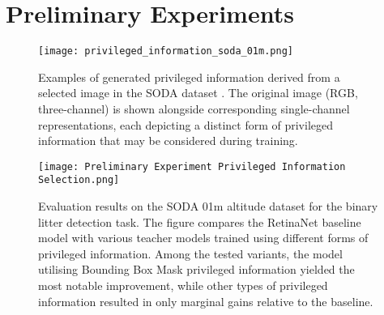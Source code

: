 \graphicspath{{content/appendices/figures/}}

\chapter{Preliminary Experiments}

\vfill
\begin{figure}[!htbp]
    \centering%
    \texttt{[image: privileged\_information\_soda\_01m.png]}
    \caption{Examples of generated privileged information derived from a selected image in the SODA dataset \cite{soda_dataset}. The original image (RGB, three-channel) is shown alongside corresponding single-channel representations, each depicting a distinct form of privileged information that may be considered during training.}
    \label{fig:channels}
\end{figure}
\vfill
\vfill
\begin{figure}[!htbp]
    \centering
    \texttt{[image: Preliminary Experiment Privileged Information Selection.png]}
    \caption{Evaluation results on the SODA 01m altitude dataset for the binary litter detection task. The figure compares the RetinaNet baseline model with various teacher models trained using different forms of privileged information. Among the tested variants, the model utilising Bounding Box Mask privileged information yielded the most notable improvement, while other types of privileged information resulted in only marginal gains relative to the baseline.}
    \label{fig:preliminary_privileged}
\end{figure}
\vfill